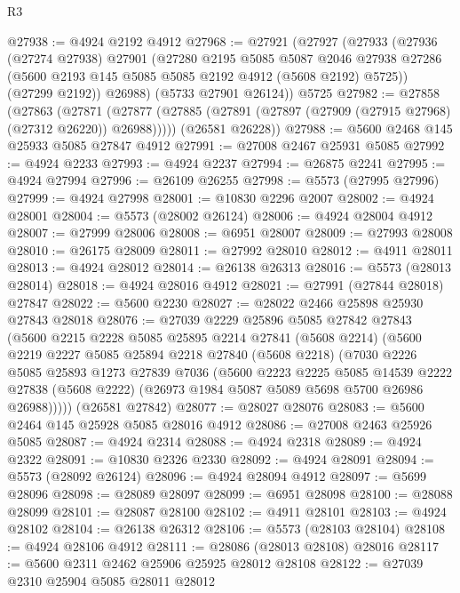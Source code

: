 \begin{lexlean}{R3}
\begin{coremodule}
@27938 := @4924 @2192 @4912
@27968 := @27921
    (@27927
      (@27933
        (@27936
          (@27274 @27938)
          @27901
          (@27280
            @2195
            @5085
            @5087
            @2046
            @27938
            @27286
            (@5600 @2193 @145 @5085 @5085 @2192 @4912 (@5608 @2192) @5725))
          (@27299 @2192))
        @26988)
      (@5733 @27901 @26124))
    @5725
@27982 := @27858
    (@27863
      (@27871 (@27877 (@27885 (@27891 (@27897 (@27909 (@27915 @27968) (@27312 @26220)) @26988)))))
      (@26581 @26228))
@27988 := @5600 @2468 @145 @25933 @5085 @27847 @4912
@27991 := @27008 @2467 @25931 @5085
@27992 := @4924 @2233
@27993 := @4924 @2237
@27994 := @26875 @2241
@27995 := @4924 @27994
@27996 := @26109 @26255
@27998 := @5573 (@27995 @27996)
@27999 := @4924 @27998
@28001 := @10830 @2296 @2007
@28002 := @4924 @28001
@28004 := @5573 (@28002 @26124)
@28006 := @4924 @28004 @4912
@28007 := @27999 @28006
@28008 := @6951 @28007
@28009 := @27993 @28008
@28010 := @26175 @28009
@28011 := @27992 @28010
@28012 := @4911 @28011
@28013 := @4924 @28012
@28014 := @26138 @26313
@28016 := @5573 (@28013 @28014)
@28018 := @4924 @28016 @4912
@28021 := @27991 (@27844 @28018) @27847
@28022 := @5600 @2230
@28027 := @28022 @2466 @25898 @25930 @27843 @28018
@28076 := @27039
    @2229
    @25896
    @5085
    @27842
    @27843
    (@5600
      @2215
      @2228
      @5085
      @25895
      @2214
      @27841
      (@5608 @2214)
      (@5600
        @2219
        @2227
        @5085
        @25894
        @2218
        @27840
        (@5608 @2218)
        (@7030
          @2226
          @5085
          @25893
          @1273
          @27839
          @7036
          (@5600
            @2223
            @2225
            @5085
            @14539
            @2222
            @27838
            (@5608 @2222)
            (@26973 @1984 @5087 @5089 @5698 @5700 @26986 @26988)))))
    (@26581 @27842)
@28077 := @28027 @28076
@28083 := @5600 @2464 @145 @25928 @5085 @28016 @4912
@28086 := @27008 @2463 @25926 @5085
@28087 := @4924 @2314
@28088 := @4924 @2318
@28089 := @4924 @2322
@28091 := @10830 @2326 @2330
@28092 := @4924 @28091
@28094 := @5573 (@28092 @26124)
@28096 := @4924 @28094 @4912
@28097 := @5699 @28096
@28098 := @28089 @28097
@28099 := @6951 @28098
@28100 := @28088 @28099
@28101 := @28087 @28100
@28102 := @4911 @28101
@28103 := @4924 @28102
@28104 := @26138 @26312
@28106 := @5573 (@28103 @28104)
@28108 := @4924 @28106 @4912
@28111 := @28086 (@28013 @28108) @28016
@28117 := @5600 @2311 @2462 @25906 @25925 @28012 @28108
@28122 := @27039 @2310 @25904 @5085 @28011 @28012

\end{coremodule}
\end{lexlean}
